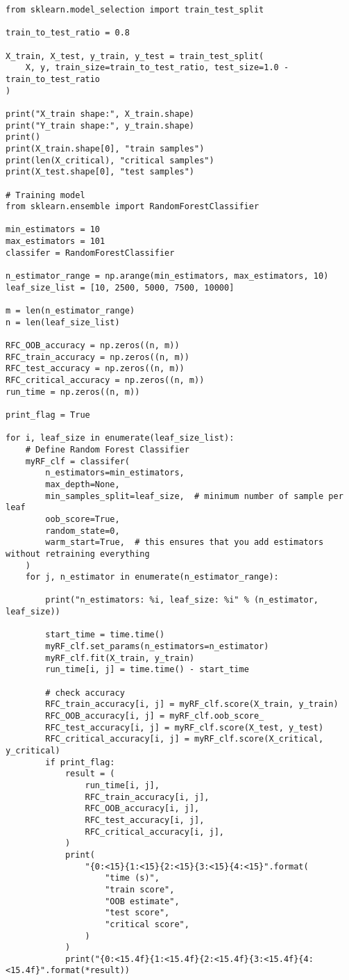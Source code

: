 \begin{verbatim}
from sklearn.model_selection import train_test_split

train_to_test_ratio = 0.8

X_train, X_test, y_train, y_test = train_test_split(
    X, y, train_size=train_to_test_ratio, test_size=1.0 - train_to_test_ratio
)

print("X_train shape:", X_train.shape)
print("Y_train shape:", y_train.shape)
print()
print(X_train.shape[0], "train samples")
print(len(X_critical), "critical samples")
print(X_test.shape[0], "test samples")

# Training model
from sklearn.ensemble import RandomForestClassifier

min_estimators = 10
max_estimators = 101
classifer = RandomForestClassifier

n_estimator_range = np.arange(min_estimators, max_estimators, 10)
leaf_size_list = [10, 2500, 5000, 7500, 10000]

m = len(n_estimator_range)
n = len(leaf_size_list)

RFC_OOB_accuracy = np.zeros((n, m))
RFC_train_accuracy = np.zeros((n, m))
RFC_test_accuracy = np.zeros((n, m))
RFC_critical_accuracy = np.zeros((n, m))
run_time = np.zeros((n, m))

print_flag = True

for i, leaf_size in enumerate(leaf_size_list):
    # Define Random Forest Classifier
    myRF_clf = classifer(
        n_estimators=min_estimators,
        max_depth=None,
        min_samples_split=leaf_size,  # minimum number of sample per leaf
        oob_score=True,
        random_state=0,
        warm_start=True,  # this ensures that you add estimators without retraining everything
    )
    for j, n_estimator in enumerate(n_estimator_range):

        print("n_estimators: %i, leaf_size: %i" % (n_estimator, leaf_size))

        start_time = time.time()
        myRF_clf.set_params(n_estimators=n_estimator)
        myRF_clf.fit(X_train, y_train)
        run_time[i, j] = time.time() - start_time

        # check accuracy
        RFC_train_accuracy[i, j] = myRF_clf.score(X_train, y_train)
        RFC_OOB_accuracy[i, j] = myRF_clf.oob_score_
        RFC_test_accuracy[i, j] = myRF_clf.score(X_test, y_test)
        RFC_critical_accuracy[i, j] = myRF_clf.score(X_critical, y_critical)
        if print_flag:
            result = (
                run_time[i, j],
                RFC_train_accuracy[i, j],
                RFC_OOB_accuracy[i, j],
                RFC_test_accuracy[i, j],
                RFC_critical_accuracy[i, j],
            )
            print(
                "{0:<15}{1:<15}{2:<15}{3:<15}{4:<15}".format(
                    "time (s)",
                    "train score",
                    "OOB estimate",
                    "test score",
                    "critical score",
                )
            )
            print("{0:<15.4f}{1:<15.4f}{2:<15.4f}{3:<15.4f}{4:<15.4f}".format(*result))


\end{verbatim}
